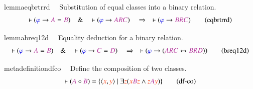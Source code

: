 \begin{restatable}{lemma}{eqbrtrrd}~~ Substitution of equal classes into a
binary relation.  ~
\begin{align}
\vdash ( \mw{\varphi} \rightarrow \mc{A} = \mc{B} )\quad\&\quad \vdash (
    \mw{\varphi} \rightarrow \mc{A} \mc{R} \mc{C} )\quad\Rightarrow\quad \vdash
    ( \mw{\varphi} \rightarrow \mc{B} \mc{R} \mc{C}
    )\label{eq:eqbrtrrd}\tag{eqbrtrrd}
\end{align}
\end{restatable}

\dfdisj

\dfbr

\begin{restatable}{lemma}{breq12d}~~ Equality deduction for a binary relation. 
~  ~
\begin{align}
\vdash ( \mw{\varphi} \rightarrow \mc{A} = \mc{B} )\quad\&\quad \vdash (
    \mw{\varphi} \rightarrow \mc{C} = \mc{D} )\quad\Rightarrow\quad \vdash (
    \mw{\varphi} \rightarrow ( \mc{A} \mc{R} \mc{C} \leftrightarrow \mc{B}
    \mc{R} \mc{D} ) )\label{eq:breq12d}\tag{breq12d}
\end{align}
\end{restatable}

\begin{restatable}{metadefinition}{dfco}~~ Define the composition of two classes. 
\begin{align}
\vdash ( \mc{A} \circ \mc{B} ) = \{ \langle \msc{x} , \msc{y} \rangle~\vert~\exists
    \msc{z} ( \msc{x} \mc{B} \msc{z} \wedge \msc{z} \mc{A} \msc{y} )
    \}\label{eq:df-co}\tag{df-co}
\end{align}
\end{restatable}

